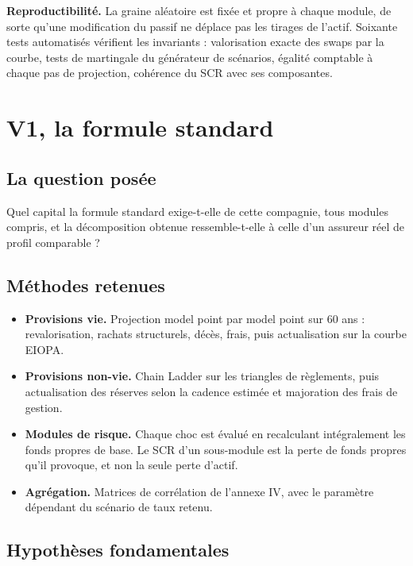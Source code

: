 \documentclass[11pt,a4paper]{article}
\begin{document}
\textbf{Reproductibilité.} La graine aléatoire est fixée et propre à chaque module, de sorte
qu'une modification du passif ne déplace pas les tirages de l'actif. Soixante tests automatisés
vérifient les invariants : valorisation exacte des swaps par la courbe, tests de martingale du
générateur de scénarios, égalité comptable à chaque pas de projection, cohérence du SCR avec ses
composantes.

\section{V1, la formule standard}

\subsection{La question posée}

Quel capital la formule standard exige-t-elle de cette compagnie, tous modules compris, et la
décomposition obtenue ressemble-t-elle à celle d'un assureur réel de profil comparable ?

\subsection{Méthodes retenues}

\begin{itemize}
\item \textbf{Provisions vie.} Projection model point par model point sur 60 ans :
      revalorisation, rachats structurels, décès, frais, puis actualisation sur la courbe EIOPA.
\item \textbf{Provisions non-vie.} Chain Ladder sur les triangles de règlements, puis
      actualisation des réserves selon la cadence estimée et majoration des frais de gestion.
\item \textbf{Modules de risque.} Chaque choc est évalué en recalculant intégralement les fonds
      propres de base. Le SCR d'un sous-module est la perte de fonds propres qu'il provoque, et
      non la seule perte d'actif.
\item \textbf{Agrégation.} Matrices de corrélation de l'annexe IV, avec le paramètre dépendant du
      scénario de taux retenu.
\end{itemize}

\subsection{Hypothèses fondamentales}
\end{document}
